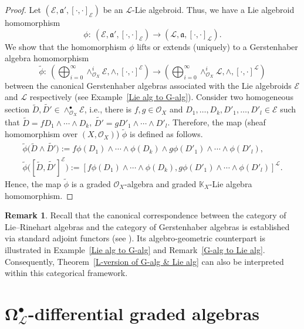 \documentclass[pdftex]{sigma}
\numberwithin{equation}{section}
\theoremstyle{definition}
\newtheorem{Rem}[Thm]{Remark}
\begin{document}
\begin{proof}
	Let $(\mathcal{E}, \mathfrak{a'},[\cdot,\cdot]_{\mathcal{E}})$ be an $\mathcal{L}$-Lie algebroid. Thus, we have a Lie algebroid homomorphism
\[
\phi\colon \ (\mathcal{E}, \mathfrak{a'},[\cdot,\cdot]_{\mathcal{E}}) \rightarrow (\mathcal{L}, \mathfrak{a},[\cdot,\cdot]_{\mathcal{L}}).
\]
	We show that the homomorphism $\phi$ lifts or extends (uniquely) to a Gerstenhaber algebra homomorphism
\[
\tilde{\phi}\colon \ \left(\bigoplus^{\infty}_{i=0} \wedge_{\mathcal{O}_X}^i \mathcal{E}, \wedge, [\cdot,\cdot]^{\mathcal{E}}\right) \rightarrow \left(\bigoplus^{\infty}_{i=0} \wedge_{\mathcal{O}_X}^i \mathcal{L}, \wedge, [\cdot,\cdot]^{\mathcal{L}}\right)
\]
	between the canonical Gerstenhaber algebras associated with the Lie algebroids $\mathcal{E}$ and $\mathcal{L}$ respectively (see Example~\ref{Lie alg to G-alg}).
	Consider two homogeneous section $\tilde{D}, \tilde{D'} \in \wedge_{\mathcal{O}_X}^\bullet \mathcal{E}$, i.e., there is $f,g \in \mathcal{O}_X$ and $D_1, \dots, D_k, D'_1, \dots, D'_l \in \mathcal{E}$ such that
	$\tilde{D}=f D_1\wedge \cdots \wedge D_k$, $\tilde{D'}=g D'_1\wedge \cdots \wedge D'_l$.
	Therefore, the map (sheaf homomorphism over $(X, \mathcal{O}_X)$) $\tilde{\phi}$ is defined as follows.
\begin{gather*}
\tilde{\phi}\bigl(\tilde{D} \wedge \tilde{D'}\bigr):=f \phi(D_1)\wedge \cdots \wedge \phi(D_k)\wedge g \phi(D'_1)\wedge \cdots \wedge \phi(D'_l),\\
\tilde{\phi}\bigl([\tilde{D},\tilde{D'}]^{\mathcal{E}}\bigr):=[f \phi(D_1)\wedge \cdots \wedge \phi(D_k), g \phi(D'_1)\wedge \cdots \wedge \phi(D'_l)]^{\mathcal{L}}.
\end{gather*}
	Hence, the map $\tilde{\phi}$ is a graded $\mathcal{O}_X$-algebra and graded $\mathbb{K}_X$-Lie algebra homomorphism.
\end{proof}
\begin{Rem}
	Recall that the canonical correspondence between the category of Lie--Rinehart algebras and the category of Gerstenhaber algebras is established via standard adjoint functors (see \cite{MG-SS, JH2}). Its algebro-geometric counterpart is illustrated in Example~\ref{Lie alg to G-alg} and Remark~\ref{G-alg to Lie alg}. Consequently, Theorem~\ref{L-version of G-alg & Lie alg} can also be interpreted within this categorical framework.
\end{Rem}

\section[Omega\^{}bullet\_L-differential graded algebras]{$\boldsymbol{\Omega^{\bullet}_{\mathcal{L}}}$-differential graded algebras}	\label{Sec 4}
\end{document}
